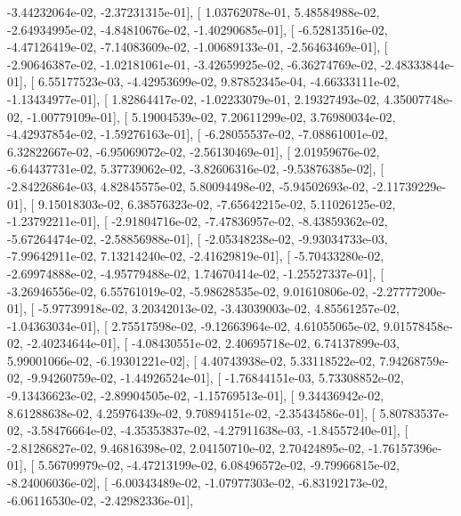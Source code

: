 \documentclass{article}
\begin{document}
         -3.44232064e-02,  -2.37231315e-01],
       [  1.03762078e-01,   5.48584988e-02,  -2.64934995e-02,
         -4.84810676e-02,  -1.40290685e-01],
       [ -6.52813516e-02,  -4.47126419e-02,  -7.14083609e-02,
         -1.00689133e-01,  -2.56463469e-01],
       [ -2.90646387e-02,  -1.02181061e-01,  -3.42659925e-02,
         -6.36274769e-02,  -2.48333844e-01],
       [  6.55177523e-03,  -4.42953699e-02,   9.87852345e-04,
         -4.66333111e-02,  -1.13434977e-01],
       [  1.82864417e-02,  -1.02233079e-01,   2.19327493e-02,
          4.35007748e-02,  -1.00779109e-01],
       [  5.19004539e-02,   7.20611299e-02,   3.76980034e-02,
         -4.42937854e-02,  -1.59276163e-01],
       [ -6.28055537e-02,  -7.08861001e-02,   6.32822667e-02,
         -6.95069072e-02,  -2.56130469e-01],
       [  2.01959676e-02,  -6.64437731e-02,   5.37739062e-02,
         -3.82606316e-02,  -9.53876385e-02],
       [ -2.84226864e-03,   4.82845575e-02,   5.80094498e-02,
         -5.94502693e-02,  -2.11739229e-01],
       [  9.15018303e-02,   6.38576323e-02,  -7.65642215e-02,
          5.11026125e-02,  -1.23792211e-01],
       [ -2.91804716e-02,  -7.47836957e-02,  -8.43859362e-02,
         -5.67264474e-02,  -2.58856988e-01],
       [ -2.05348238e-02,  -9.93034733e-03,  -7.99642911e-02,
          7.13214240e-02,  -2.41629819e-01],
       [ -5.70433280e-02,  -2.69974888e-02,  -4.95779488e-02,
          1.74670414e-02,  -1.25527337e-01],
       [ -3.26946556e-02,   6.55761019e-02,  -5.98628535e-02,
          9.01610806e-02,  -2.27777200e-01],
       [ -5.97739918e-02,   3.20342013e-02,  -3.43039003e-02,
          4.85561257e-02,  -1.04363034e-01],
       [  2.75517598e-02,  -9.12663964e-02,   4.61055065e-02,
          9.01578458e-02,  -2.40234644e-01],
       [ -4.08430551e-02,   2.40695718e-02,   6.74137899e-03,
          5.99001066e-02,  -6.19301221e-02],
       [  4.40743938e-02,   5.33118522e-02,   7.94268759e-02,
         -9.94260759e-02,  -1.44926524e-01],
       [ -1.76844151e-03,   5.73308852e-02,  -9.13436623e-02,
         -2.89904505e-02,  -1.15769513e-01],
       [  9.34436942e-02,   8.61288638e-02,   4.25976439e-02,
          9.70894151e-02,  -2.35434586e-01],
       [  5.80783537e-02,  -3.58476664e-02,  -4.35353837e-02,
         -4.27911638e-03,  -1.84557240e-01],
       [ -2.81286827e-02,   9.46816398e-02,   2.04150710e-02,
          2.70424895e-02,  -1.76157396e-01],
       [  5.56709979e-02,  -4.47213199e-02,   6.08496572e-02,
         -9.79966815e-02,  -8.24006036e-02],
       [ -6.00343489e-02,  -1.07977303e-02,  -6.83192173e-02,
         -6.06116530e-02,  -2.42982336e-01],
\end{document}

